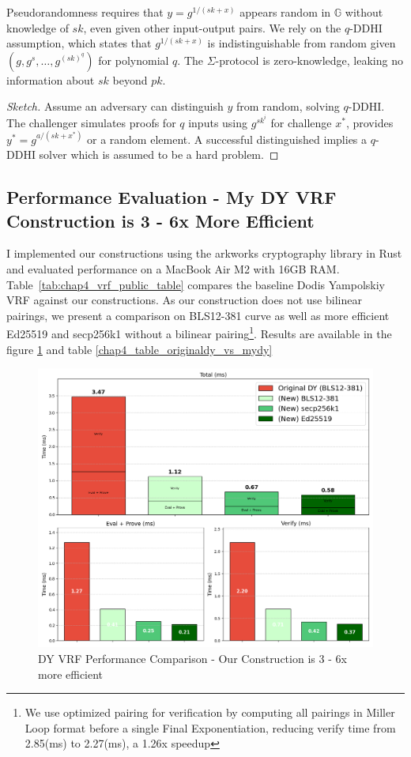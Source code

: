Pseudorandomness requires that $y = g^{1/(sk + x)}$ appears random in $\mathbb{G}$ without knowledge of $sk$, even given other input-output pairs. We rely on the $q$-DDHI assumption, which states that $g^{1/(sk + x)}$ is indistinguishable from random given $(g, g^{s}, \ldots, g^{(sk)^q})$ for polynomial $q$. 
The $\Sigma$-protocol is zero-knowledge, leaking no information about $sk$ beyond $pk$.

\begin{proof}[Sketch]
    Assume an adversary can distinguish $y$ from random, solving $q$-DDHI. The challenger simulates proofs for $q$ inputs using $g^{sk^i}$ for challenge $x^*$, provides $y^* = g^{a/(sk + x^*)}$ or a random element. A successful distinguished implies a $q$-DDHI solver which is assumed to be a hard problem.
\end{proof}


\subsection{Performance Evaluation - My DY VRF Construction is 3 - 6x More Efficient}

I implemented our constructions \cite{polgar_anonymous_2025} using the arkworks cryptography library \cite{arkworks_contributors_arkworks_2022} in Rust and evaluated performance on a MacBook Air M2 with 16GB RAM. Table~\ref{tab:chap4_vrf_public_table} compares the baseline Dodis Yampolskiy VRF against our constructions. As our construction does not use bilinear pairings, we present a comparison on BLS12-381 curve as well as more efficient Ed25519 and secp256k1 without a bilinear pairing\footnote{We use optimized pairing for verification by computing all pairings in Miller Loop format before a single Final Exponentiation, reducing verify time from 2.85(ms) to 2.27(ms), a 1.26x speedup}. Results are available in the figure \ref{fig:chap4_public_vrf} and table \ref{chap4_table_originaldy_vs_mydy}


\begin{figure}[!htb]
    \centering
    \includegraphics[width=0.75\linewidth]{figures/chap4_dy_comparisons.png}
        \caption[Our DY VRF Construction is 3 - 6x more efficient]{DY VRF Performance Comparison - Our Construction is 3 - 6x more efficient}
    \label{fig:chap4_public_vrf}
\end{figure}

